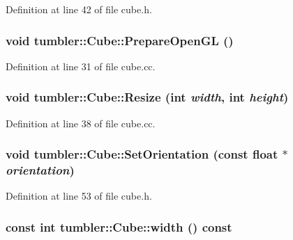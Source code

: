 Definition at line 42 of file cube.h.

\hypertarget{classtumbler_1_1_cube_a62b97b480f8cbccf49cfe650c19590ec}{
\subsubsection[{PrepareOpenGL}]{\setlength{\rightskip}{0pt plus 5cm}void tumbler::Cube::PrepareOpenGL ()}}
\label{classtumbler_1_1_cube_a62b97b480f8cbccf49cfe650c19590ec}


Definition at line 31 of file cube.cc.

\hypertarget{classtumbler_1_1_cube_aa618965575cca4ce046576220d7e45d7}{
\subsubsection[{Resize}]{\setlength{\rightskip}{0pt plus 5cm}void tumbler::Cube::Resize (int {\em width}, \/  int {\em height})}}
\label{classtumbler_1_1_cube_aa618965575cca4ce046576220d7e45d7}


Definition at line 38 of file cube.cc.

\hypertarget{classtumbler_1_1_cube_af2dfb9b62408f6c2773a88653c753860}{
\subsubsection[{SetOrientation}]{\setlength{\rightskip}{0pt plus 5cm}void tumbler::Cube::SetOrientation (const float $\ast$ {\em orientation})}}
\label{classtumbler_1_1_cube_af2dfb9b62408f6c2773a88653c753860}


Definition at line 53 of file cube.h.

\hypertarget{classtumbler_1_1_cube_ab943f389a373cb1388662e5f6a6b784e}{
\subsubsection[{width}]{\setlength{\rightskip}{0pt plus 5cm}const int tumbler::Cube::width () const}}
\label{classtumbler_1_1_cube_ab943f389a373cb1388662e5f6a6b784e}


